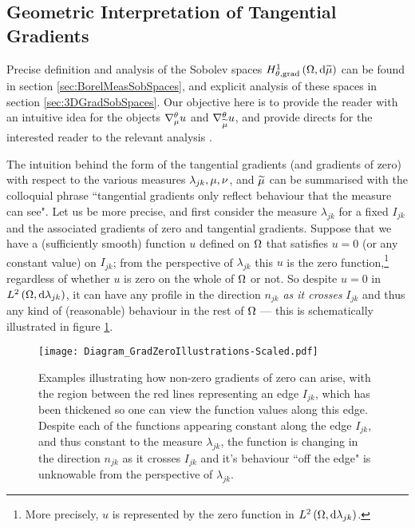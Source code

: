 \subsection{Geometric Interpretation of Tangential Gradients} \label{ssec:3DGradGeometric}
Precise definition and analysis of the Sobolev spaces $H^1_{\theta, \mathrm{grad}}\left( \Omega, \mathrm{d}\widetilde{\mu} \right)$ can be found in section \ref{sec:BorelMeasSobSpaces}, and explicit analysis of these spaces in section \ref{sec:3DGradSobSpaces}.
Our objective here is to provide the reader with an intuitive idea for the objects $\nabla^{\theta}_{\mu}u$ and $\nabla^{\theta}_{\widetilde{\mu}}u$, and provide directs for the interested reader to the relevant analysis .

The intuition behind the form of the tangential gradients (and gradients of zero) with respect to the various measures $\lambda_{jk}, \mu, \nu$, and $\widetilde{\mu}$ can be summarised with the colloquial phrase ``tangential gradients only reflect behaviour that the measure can see".
Let us be more precise, and first consider the measure $\lambda_{jk}$ for a fixed $I_{jk}$ and the associated gradients of zero and tangential gradients.
Suppose that we have a (sufficiently smooth) function $u$ defined on $\Omega$ that satisfies $u=0$ (or any constant value) on $I_{jk}$; from the perspective of $\lambda_{jk}$ this $u$ is the zero function,\footnote{More precisely, $u$ is represented by the zero function in $L^{2}\left( \Omega,\mathrm{d}\lambda_{jk} \right)$.} regardless of whether $u$ is zero on the whole of $\Omega$ or not.
So despite $u=0$ in $L^{2}\left( \Omega,\mathrm{d}\lambda_{jk} \right)$, it can have any profile in the direction $n_{jk}$ \emph{as it crosses} $I_{jk}$ and thus any kind of (reasonable) behaviour in the rest of $\Omega$ --- this is schematically illustrated in figure \ref{fig:Diagram_GradZeroIllustrations}.
\begin{figure}[b!]
	\centering
	\texttt{[image: Diagram\_GradZeroIllustrations-Scaled.pdf]}
	\caption{\label{fig:Diagram_GradZeroIllustrations} Examples illustrating how non-zero gradients of zero can arise, with the region between the red lines representing an edge $I_{jk}$, which has been thickened so one can view the function values along this edge. Despite each of the functions appearing constant along the edge $I_{jk}$, and thus constant to the measure $\lambda_{jk}$, the function is changing in the direction $n_{jk}$ as it crosses $I_{jk}$ and it's behaviour ``off the edge" is unknowable from the perspective of $\lambda_{jk}$.}
\end{figure}
